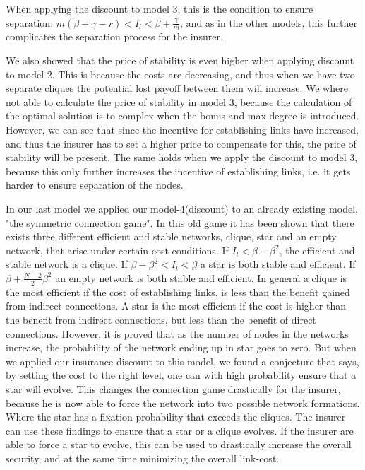 When applying the discount to model 3, this is the condition to ensure separation: $m(\beta+\gamma-r)<I_{l}<\beta+\frac{\gamma}{m}$, and as in the other models, this further complicates the separation process for the insurer. 

We also showed that the price of stability is even higher when applying discount to model 2. This is because the costs are decreasing, and thus when we have two separate cliques the potential lost payoff between them will increase.
We where not able to calculate the price of stability in model 3, because the calculation of the optimal solution is to complex when the bonus and max degree is introduced. However, we can see that since the incentive for establishing links have increased, and thus the insurer has to set a higher price to compensate for this, the price of stability will be present. The same holds when we apply the discount to model 3, because this only further increases the incentive of establishing links, i.e. it gets harder to ensure separation of the nodes.  

In our last model we applied our model-4(discount) to an already existing model, "the symmetric connection game". In this old game it has been shown that there exists three different efficient and stable networks, clique, star and an empty network, that arise under certain cost conditions. If $I_{l}<\beta-\beta^{2}$, the efficient and stable network is a clique. If $\beta-\beta^{2}<I_{l}<\beta$ a star is both stable and efficient. If $\beta+\frac{N-2}{2}\beta^{2}$ an empty network is both stable and efficient. In general a clique is the most efficient if the cost of establishing links, is less than the benefit gained from indirect connections. A star is the most efficient if the cost is higher than the benefit from indirect connections, but less than the benefit of direct connections. 
However, it is proved that as the number of nodes in the networks increase, the probability of the network ending up in star goes to zero. But when we applied our insurance discount to this model, we found a conjecture that says, by setting the cost to the right level, one can with high probability ensure that a star will evolve. This changes the connection game drastically for the insurer, because he is now able to force the network into two possible network formations. Where the star has a fixation probability that exceeds the cliques. The insurer can use these findings to ensure that a star or a clique evolves. If the insurer are able to force a star to evolve, this can be used to drastically increase the overall security, and at the same time minimizing the overall link-cost. 

